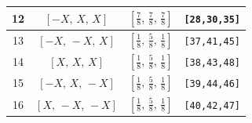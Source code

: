 \documentclass[fleqn,8pt]{jsarticle}
\begin{document}
\begin{longtable}{cccc}
12 & $\left[ - X,\, X,\, X \right]$ & $\left[ \frac{7}{8},\, \frac{7}{8},\, \frac{7}{8} \right]$ & {\tt [28,30,35]} \\ \hline
13 & $\left[ - X,\, - X,\, X \right]$ & $\left[ \frac{1}{8},\, \frac{5}{8},\, \frac{1}{8} \right]$ & {\tt [37,41,45]} \\ \hline
14 & $\left[ X,\, X,\, X \right]$ & $\left[ \frac{1}{8},\, \frac{5}{8},\, \frac{1}{8} \right]$ & {\tt [38,43,48]} \\ \hline
15 & $\left[ - X,\, X,\, - X \right]$ & $\left[ \frac{1}{8},\, \frac{5}{8},\, \frac{1}{8} \right]$ & {\tt [39,44,46]} \\ \hline
16 & $\left[ X,\, - X,\, - X \right]$ & $\left[ \frac{1}{8},\, \frac{5}{8},\, \frac{1}{8} \right]$ & {\tt [40,42,47]} \\
\end{longtable}
\renewcommand{\arraystretch}{1.2}
\end{document}
